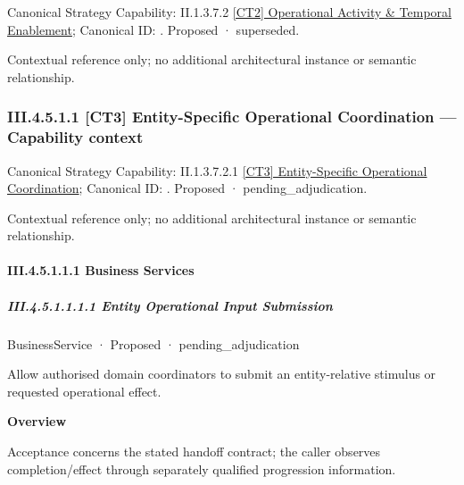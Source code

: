 {\small Canonical Strategy Capability: II.1.3.7.2 \hyperref[element:ca96b2b2ff434854995711e403e95f6f]{[CT2] Operational Activity \& Temporal Enablement}; Canonical ID: \texttt{}. Proposed · superseded.}\par
Contextual reference only; no additional architectural instance or semantic relationship.\par
\subsubsection*{III.4.5.1.1 [CT3] Entity-Specific Operational Coordination — Capability context}
\label{navigation:III.4.5.1.1}

{\small Canonical Strategy Capability: II.1.3.7.2.1 \hyperref[element:9f0c1429b64f4f88982fbbda6eaec233]{[CT3] Entity-Specific Operational Coordination}; Canonical ID: \texttt{}. Proposed · pending\_adjudication.}\par
Contextual reference only; no additional architectural instance or semantic relationship.\par
\paragraph*{III.4.5.1.1.1 Business Services}
\label{navigation:III.4.5.1.1.1}

\subparagraph*{III.4.5.1.1.1.1 Entity Operational Input Submission}
\label{navigation:III.4.5.1.1.1.1}

\label{element:6a27b36b624444d4b09e68f286045d46}
{\small BusinessService · Proposed · pending\_adjudication}\par

Allow authorised domain coordinators to submit an entity-relative stimulus or requested operational effect.



\textbf{Overview}



Acceptance concerns the stated handoff contract; the caller observes completion/effect through separately qualified progression information.



